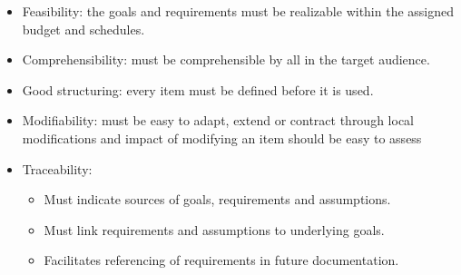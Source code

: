 \documentclass[12pt, a4paper]{report}
\begin{document}
\begin{itemize}
            \item Feasibility: the goals and requirements must be realizable within the assigned budget and schedules. 
            \item Comprehensibility: must be comprehensible by all in the target audience.
            \item Good structuring: every item must be defined before it is used.
            \item Modifiability: must be easy to adapt, extend or contract through local modifications and impact of modifying an item should be easy to assess
            \item Traceability: 
            \begin{itemize}
                \item Must indicate sources of goals, requirements and assumptions. 
                \item Must link requirements and assumptions to underlying goals.
                \item Facilitates referencing of requirements in future documentation.
            \end{itemize}
        \end{itemize}   
\end{document}
